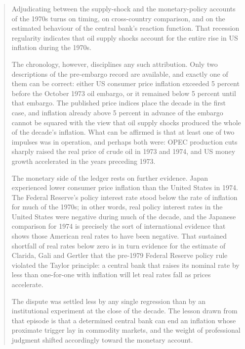\begin{quote}\small
Adjudicating between the supply-shock and the monetary-policy accounts of the 1970s turns on timing, on cross-country comparison, and on the estimated behaviour of the central bank's reaction function.   That recession regularity indicates that oil supply shocks account for the entire rise in US inflation during the 1970s.

The chronology, however, disciplines any such attribution. Only two descriptions of the pre-embargo record are available, and exactly one of them can be correct: either US consumer price inflation exceeded 5 percent before the October 1973 oil embargo, or it remained below 5 percent until that embargo. The published price indices place the decade in the first case, and inflation already above 5 percent in advance of the embargo cannot be squared with the view that oil supply shocks produced the whole of the decade's inflation. What can be affirmed is that at least one of two impulses was in operation, and perhaps both were: OPEC production cuts sharply raised the real price of crude oil in 1973 and 1974, and US money growth accelerated in the years preceding 1973.

The monetary side of the ledger rests on further evidence. Japan experienced lower consumer price inflation than the United States in 1974. The Federal Reserve's policy interest rate stood below the rate of inflation for much of the 1970s; in other words, real policy interest rates in the United States were negative during much of the decade, and the Japanese comparison for 1974 is precisely the sort of international evidence that shows those American real rates to have been negative. That sustained shortfall of real rates below zero is in turn evidence for the estimate of Clarida, Gali and Gertler that the pre-1979 Federal Reserve policy rule violated the Taylor principle: a central bank that raises its nominal rate by less than one-for-one with inflation will let real rates fall as prices accelerate.

The dispute was settled less by any single regression than by an institutional experiment at the close of the decade.  The lesson drawn from that episode is that a determined central bank can end an inflation whose proximate trigger lay in commodity markets, and the weight of professional judgment shifted accordingly toward the monetary account.
\end{quote}

